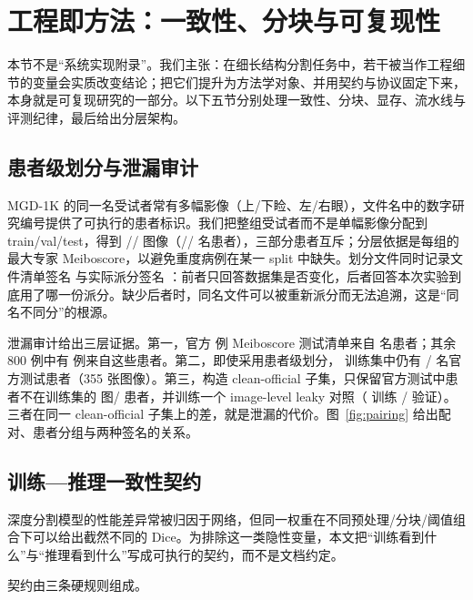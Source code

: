 \section{工程即方法：一致性、分块与可复现性}\label{sec:engineering}

本节不是“系统实现附录”。我们主张：在细长结构分割任务中，若干被当作工程细节的变量会实质改变结论；把它们提升为方法学对象、并用契约与协议固定下来，本身就是可复现研究的一部分。以下五节分别处理一致性、分块、显存、流水线与评测纪律，最后给出分层架构。

\subsection{患者级划分与泄漏审计}\label{sec:leakage}

MGD-1K 的同一名受试者常有多幅影像（上/下睑、左/右眼），文件名中的数字研究编号提供了可执行的患者标识。我们把整组受试者而不是单幅影像分配到 train/val/test，得到 \nTrain/\nVal/\nTest{} 图像（\nTrainPatients/\nValPatients/\nTestPatients{} 名患者），三部分患者互斥；分层依据是每组的最大专家 Meiboscore，以避免重度病例在某一 split 中缺失。划分文件同时记录文件清单签名 \splitSig{} 与实际派分签名 \assignmentSig{}：前者只回答数据集是否变化，后者回答本次实验到底用了哪一份派分。缺少后者时，同名文件可以被重新派分而无法追溯，这是“同名不同分”的根源。

泄漏审计给出三层证据。第一，官方 \officialTestImages{} 例 Meiboscore 测试清单来自 \officialTestPatients{} 名患者；其余 800 例中有 \officialLeakImages{} 例来自这些患者。第二，即使采用患者级划分，\nTrain{} 训练集中仍有 \officialLeakPatients/\officialTestPatients{} 名官方测试患者（355 张图像）。第三，构造 clean-official 子集，只保留官方测试中患者不在训练集的 \cleanOfficialImages{} 图/\cleanOfficialPatients{} 患者，并训练一个 image-level leaky 对照（\leakyTrainImages{} 训练 / \leakyValImages{} 验证）。三者在同一 clean-official 子集上的差，就是泄漏的代价。图~\ref{fig:pairing} 给出配对、患者分组与两种签名的关系。

\subsection{训练—推理一致性契约}\label{sec:contract}

深度分割模型的性能差异常被归因于网络，但同一权重在不同预处理/分块/阈值组合下可以给出截然不同的 Dice。为排除这一类隐性变量，本文把“训练看到什么”与“推理看到什么”写成可执行的契约，而不是文档约定。

契约由三条硬规则组成。

